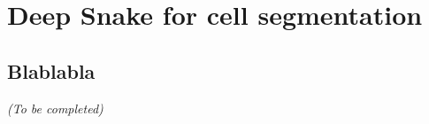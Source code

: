 
\graphicspath{{../../figures/appendix/}}

\chapter{Deep Snake for cell segmentation}
\label{ch:deep_snake_appendix}

\newpage

\section{Blablabla}
\label{sec:blablabla_deep_snake_appendix}

\begin{center}
	\textit{(To be completed)}
\end{center}
